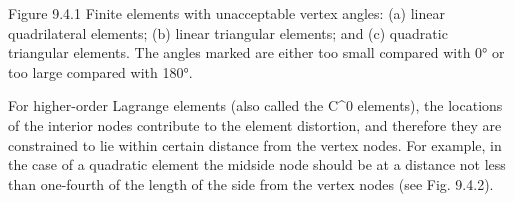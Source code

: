 \documentclass[11pt,a4paper]{article}
\begin{document}
\begin{pasaje}\footnotesize Figure 9.4.1 Finite elements with unacceptable vertex angles: (a) linear quadrilateral elements; (b) linear triangular elements; and (c) quadratic triangular elements. The angles marked are either too small compared with 0° or too large compared with 180°.

For higher-order Lagrange elements (also called the C\textasciicircum{}0 elements), the locations of the interior nodes contribute to the element distortion, and therefore they are constrained to lie within certain distance from the vertex nodes. For example, in the case of a quadratic element the midside node should be at a distance not less than one-fourth of the length of the side from the vertex nodes (see Fig. 9.4.2).\end{pasaje}
\vspace{6pt}
\end{document}
